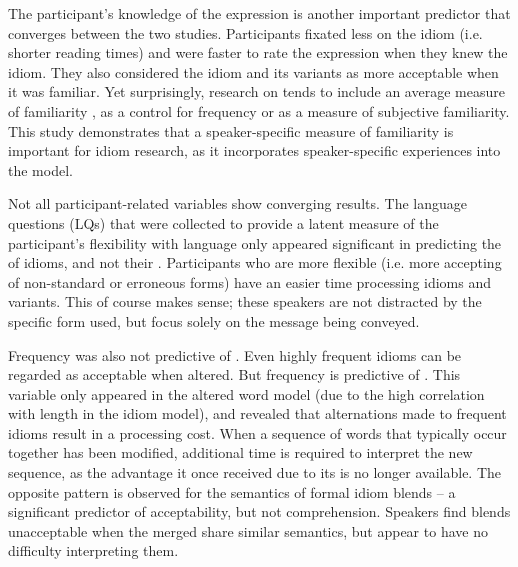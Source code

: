 \documentclass[output=paper
,modfonts
,nonflat]{langsci/langscibook}
\begin{document}
The participant's knowledge of the expression is another important predictor that converges between the two studies.  Participants fixated less on the idiom (i.e. shorter reading times) and were faster to rate the expression when they knew the idiom. They also considered the idiom and its variants as more acceptable when it was familiar. Yet surprisingly, research on  tends to include an average measure of familiarity \citep[cf.][]{TitoneConnine1994}, as a control for frequency or as a measure of subjective familiarity. This study demonstrates that a speaker-specific measure of familiarity is important for idiom research, as it incorporates speaker-specific experiences into the model.

Not all participant-related variables show converging results. The language questions (LQs) that were collected to provide a latent measure of the participant's flexibility with language only appeared significant in predicting the  of idioms, and not their . Participants who are more flexible (i.e. more accepting of non-standard or erroneous forms) have an easier time processing idioms and variants. This of course makes sense; these speakers are not distracted by the specific form used, but focus solely on the message being conveyed.  

Frequency was also not predictive of . Even highly frequent idioms can be regarded as acceptable when altered. But frequency is predictive of . This variable only appeared in the altered word model (due to the high correlation with length in the idiom model), and revealed that alternations made to frequent idioms result in a processing cost. When a sequence of words that typically occur together has been modified, additional time is required to interpret the new sequence, as the advantage it once received due to its  is no longer available. The opposite pattern is observed for the semantics of formal idiom blends  -- a significant predictor of acceptability, but not comprehension. Speakers find blends unacceptable when the merged  share similar semantics, but appear to have no difficulty interpreting them.
\end{document}
